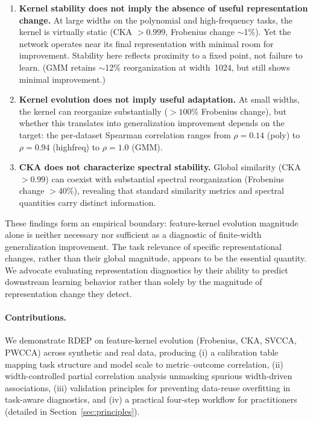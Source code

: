 \documentclass[twoside,11pt]{article}
\begin{document}
\begin{enumerate}
    \item \textbf{Kernel stability does not imply the absence of useful representation change.}  At large widths on the polynomial and high-frequency tasks, the kernel is virtually static (CKA $>0.999$, Frobenius change $\sim$1\%). Yet the network operates near its final representation with minimal room for improvement. Stability here reflects proximity to a fixed point, not failure to learn.  (GMM retains $\sim$12\% reorganization at width~1024, but still shows minimal improvement.)
    \item \textbf{Kernel evolution does not imply useful adaptation.}  At small widths, the kernel can reorganize substantially ($>100\%$ Frobenius change), but whether this translates into generalization improvement depends on the target: the per-dataset Spearman correlation ranges from $\rho=0.14$ (poly) to $\rho=0.94$ (highfreq) to $\rho=1.0$ (GMM).
    \item \textbf{CKA does not characterize spectral stability.}  Global similarity (CKA $>0.99$) can coexist with substantial spectral reorganization (Frobenius change $>40\%$), revealing that standard similarity metrics and spectral quantities carry distinct information.
\end{enumerate}

These findings form an empirical boundary: feature-kernel evolution magnitude alone is neither necessary nor sufficient as a diagnostic of finite-width generalization improvement.  The task relevance of specific representational changes, rather than their global magnitude, appears to be the essential quantity.  We advocate evaluating representation diagnostics by their ability to predict downstream learning behavior rather than solely by the magnitude of representation change they detect.

\paragraph{Contributions.}
We demonstrate RDEP on feature-kernel evolution (Frobenius, CKA, SVCCA, PWCCA) across synthetic and real data, producing (i) a calibration table mapping task structure and model scale to metric--outcome correlation, (ii) width-controlled partial correlation analysis unmasking spurious width-driven associations, (iii) validation principles for preventing data-reuse overfitting in task-aware diagnostics, and (iv) a practical four-step workflow for practitioners (detailed in Section~\ref{sec:principles}).
\end{document}
